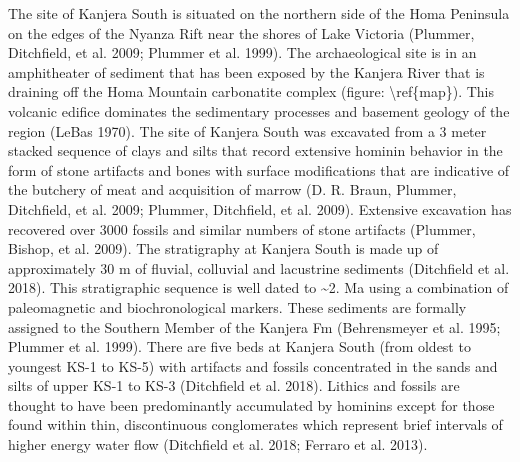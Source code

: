 \documentclass[]{elsarticle} %
\begin{document}
The site of Kanjera South is situated on the northern side of the Homa
Peninsula on the edges of the Nyanza Rift near the shores of Lake
Victoria (Plummer, Ditchfield, et al. 2009; Plummer et al. 1999). The
archaeological site is in an amphitheater of sediment that has been
exposed by the Kanjera River that is draining off the Homa Mountain
carbonatite complex (figure: \textbackslash{}ref\{map\}). This volcanic
edifice dominates the sedimentary processes and basement geology of the
region (LeBas 1970). The site of Kanjera South was excavated from a 3
meter stacked sequence of clays and silts that record extensive hominin
behavior in the form of stone artifacts and bones with surface
modifications that are indicative of the butchery of meat and
acquisition of marrow (D. R. Braun, Plummer, Ditchfield, et al. 2009;
Plummer, Ditchfield, et al. 2009). Extensive excavation has recovered
over 3000 fossils and similar numbers of stone artifacts (Plummer,
Bishop, et al. 2009). The stratigraphy at Kanjera South is made up of
approximately 30 m of fluvial, colluvial and lacustrine sediments
(Ditchfield et al. 2018). This stratigraphic sequence is well dated to
\textasciitilde{}2. Ma using a combination of paleomagnetic and
biochronological markers. These sediments are formally assigned to the
Southern Member of the Kanjera Fm (Behrensmeyer et al. 1995; Plummer et
al. 1999). There are five beds at Kanjera South (from oldest to youngest
KS-1 to KS-5) with artifacts and fossils concentrated in the sands and
silts of upper KS-1 to KS-3 (Ditchfield et al. 2018). Lithics and
fossils are thought to have been predominantly accumulated by hominins
except for those found within thin, discontinuous conglomerates which
represent brief intervals of higher energy water flow (Ditchfield et al.
2018; Ferraro et al. 2013).
\end{document}
